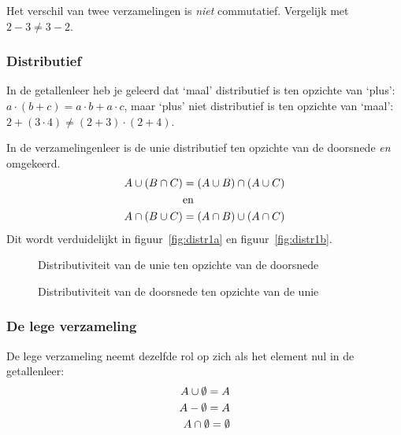 Het verschil van twee verzamelingen is \emph{niet} commutatief. Vergelijk met $2-3\not = 3-2$.

\subsubsection{Distributief}
In de getallenleer heb je geleerd dat `maal' distributief is ten opzichte van `plus': $a\cdot (b+c)=a\cdot b+a\cdot c$, maar `plus' niet distributief is ten opzichte van `maal': $2+(3\cdot 4)\not = (2+3)\cdot (2+4)$. 

In de verzamelingenleer is de unie distributief ten opzichte van de doorsnede \emph{en} omgekeerd. 
\begin{equation*}
\begin{split}
A\cup(B\cap C)&=(A\cup B) \cap (A\cup C) \\ &\mathrm{en} \\ A\cap (B\cup C)&=(A\cap B)\cup (A\cap C)
\end{split}
\end{equation*}
Dit wordt verduidelijkt in figuur~\ref{fig:distr1a} en figuur~\ref{fig:distr1b}. 

\begin{figure}[htbp]
\centering
{}\qquad
{}
\caption{Distributiviteit van de unie ten opzichte van de doorsnede}
\label{fig:distr1}
\end{figure}

\begin{figure}
\centering
{}\qquad
{}
\caption{Distributiviteit van de doorsnede ten opzichte van de unie}
\label{fig:distr2}
\end{figure}

\subsubsection{De lege verzameling}
De lege verzameling neemt dezelfde rol op zich als het element nul in de getallenleer:
\begin{equation*}
\begin{split}
A\cup \emptyset=A \\
A-\emptyset=A\\
A\cap\emptyset=\emptyset 
\end{split}
\end{equation*}

